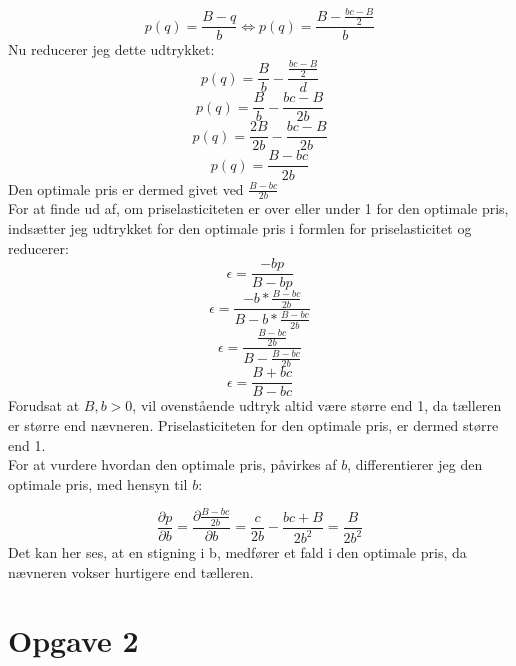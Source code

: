 \documentclass{article}
\begin{document}
\begin{equation}
    p(q)=\frac{B-q}{b} \Leftrightarrow p(q)=\frac{B-\frac{bc-B}{2}}{b}
\end{equation}
Nu reducerer jeg dette udtrykket:
\begin{equation}
    p(q)=\frac{B}{b}-\frac{\frac{bc-B}{2}}{d}
\end{equation}
\begin{equation}
    p(q)=\frac{B}{b}-\frac{bc-B}{2b}
\end{equation}
\begin{equation}
    p(q)=\frac{2B}{2b}-\frac{bc-B}{2b}
\end{equation}
\begin{equation}
    p(q)=\frac{B-bc}{2b}
\end{equation}
Den optimale pris er dermed givet ved $\frac{B-bc}{2b}$
\\
For at finde ud af, om priselasticiteten er over eller under 1 for den optimale pris, indsætter jeg udtrykket for den optimale pris i formlen for priselasticitet og reducerer:
\begin{equation}
    \epsilon = \frac{-bp}{B-bp}
\end{equation}
\begin{equation}
    \epsilon = \frac{-b*\frac{B-bc}{2b}}{B-b*\frac{B-bc}{2b}}
\end{equation}
\begin{equation}
    \epsilon = \frac{\frac{B-bc}{2b}}{B-\frac{B-bc}{2b}}
\end{equation}
\begin{equation}
    \epsilon = \frac{B+bc}{B-bc}
\end{equation}
Forudsat at $B, b > 0$, vil ovenstående udtryk altid være større end 1, da tælleren er større end nævneren. Priselasticiteten for den optimale pris, er dermed større end 1. 
\\

For at vurdere hvordan den optimale pris, påvirkes af $b$, differentierer jeg den optimale pris, med hensyn til $b$:

\begin{equation}
    \frac{\partial p}{\partial b}= \frac{ \partial \frac{B-bc}{2b}}{\partial b} =\frac{c}{2 b}-\frac{b c+B}{2 b^2}=\frac{B}{2 b^2}
\end{equation}
Det kan her ses, at en stigning i b, medfører et fald i den optimale pris, da nævneren vokser hurtigere end tælleren.

\section*{Opgave 2}
\end{document}
